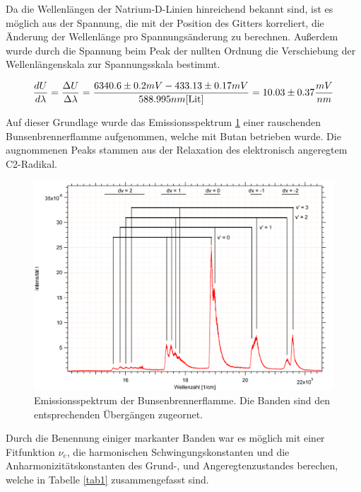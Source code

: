 


Da die Wellenlängen der Natrium-D-Linien hinreichend bekannt sind, ist es möglich aus der Spannung, die mit der Position des Gitters korreliert, die Änderung der Wellenlänge pro Spannungsänderung zu berechnen. Außerdem wurde durch die Spannung beim Peak der nullten Ordnung die Verschiebung der Wellenlängenskala zur Spannungsskala bestimmt.

\begin {equation}
\frac{dU}{d\lambda}=\frac{\Delta U}{\Delta\lambda}=\frac{6340.6\pm0.2 mV - 433.13\pm0.17 mV}{588.995 nm\cite{Lit}}=10.03\pm0.37 \frac{mV}{nm} 
\end {equation}


Auf dieser Grundlage wurde das Emissionsspektrum \ref{Bunsen} einer rauschenden Bunsenbrennerflamme aufgenommen, welche mit Butan betrieben wurde. Die augnommenen Peaks stammen aus der Relaxation des elektronisch angeregtem C2-Radikal.



\begin{figure}[H]
	\centering	
	\begin{minipage}{1\textwidth}
	\includegraphics[width=\columnwidth]{Bilder/Graph3.png}
	\end{minipage}
	
	
	\caption{Emissionsspektrum der Bunsenbrennerflamme. Die Banden sind den entsprechenden Übergängen zugeornet.}
	

	\label{Bunsen}
\end{figure}

Durch die Benennung einiger markanter Banden war es möglich mit einer Fitfunktion $\nu_e$, die harmonischen Schwingungskonstanten und die Anharmonizitätskonstanten des Grund-, und Angeregtenzustandes berechen, welche in Tabelle  \ref{tab1} zusammengefasst sind.


